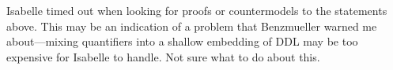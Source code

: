 \begin{isabellebody}
%
%
\endisatagproof
{\isafoldproof}%
%
\isadelimproof
%
\endisadelimproof
%
\begin{isamarkuptext}%
Isabelle timed out when looking for proofs or countermodels to the statements above. This may be 
        an indication of a problem that Benzmueller warned me about—mixing quantifiers into a shallow
        embedding of DDL may be too expensive for Isabelle to handle. Not sure what to do about this.%
\end{isamarkuptext}\isamarkuptrue%
%
\isadelimproof
%
\endisadelimproof
%
\isatagproof
%
\endisatagproof
{\isafoldproof}%
%
\isadelimproof
%
\endisadelimproof
%
\isadelimproof
%
\endisadelimproof
%
\isatagproof
%
\endisatagproof
{\isafoldproof}%
%
\isadelimproof
%
\endisadelimproof
%
\isadelimproof
%
\endisadelimproof
%
\isatagproof
%
\endisatagproof
{\isafoldproof}%
%
\isadelimproof
%
\endisadelimproof
%
\isadelimproof
%
\endisadelimproof
%
\isatagproof
%
\endisatagproof
{\isafoldproof}%
%
\isadelimproof
%
\endisadelimproof
%
\isadelimproof
%
\endisadelimproof
%
\isatagproof
%
\endisatagproof
{\isafoldproof}%
%
\isadelimproof
%
\endisadelimproof
%
\isadelimproof
%
\endisadelimproof
%
\isatagproof
%
\endisatagproof
{\isafoldproof}%
%
\isadelimproof
%
\endisadelimproof
%
\isadelimproof
%
\endisadelimproof
%
\isatagproof
%
\endisatagproof
{\isafoldproof}%
%
\isadelimproof
%
\endisadelimproof
%
\isadelimtheory
%
\endisadelimtheory
%
\isatagtheory
%
\endisatagtheory
{\isafoldtheory}%
%
\isadelimtheory
%
\endisadelimtheory
%
\end{isabellebody}%
\endinput
